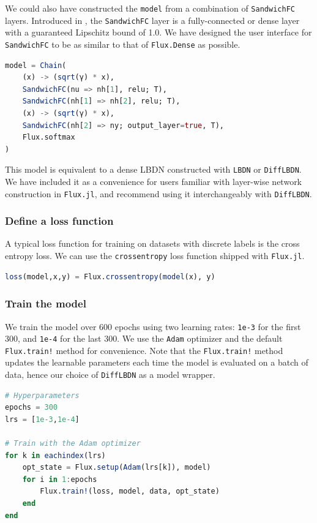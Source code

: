 We could also have constructed the \verb|model| from a combination of \verb|SandwichFC| layers. Introduced in \cite{Wang+Manchester2023}, the \verb|SandwichFC| layer is a fully-connected or dense layer with a guaranteed Lipschitz bound of 1.0. We have designed the user interface for \verb|SandwichFC| to be as similar to that of \verb|Flux.Dense| as possible.
\begin{lstlisting}[language = Julia]
model = Chain(
    (x) -> (sqrt(γ) * x),
    SandwichFC(nu => nh[1], relu; T),
    SandwichFC(nh[1] => nh[2], relu; T),
    (x) -> (sqrt(γ) * x),
    SandwichFC(nh[2] => ny; output_layer=true, T),
    Flux.softmax
)
\end{lstlisting}
This model is equivalent to a dense LBDN constructed with \verb|LBDN| or \verb|DiffLBDN|. We have included it as a convenience for users familiar with layer-wise network construction in \verb|Flux.jl|, and recommend using it interchangeably with \verb|DiffLBDN|.

\subsubsection{Define a loss function} \label{sec:mnist-loss}

A typical loss function for training on datasets with discrete labels is the cross entropy loss. We can use the \verb|crossentropy| loss function shipped with \verb|Flux.jl|.

\begin{lstlisting}[language = Julia]
loss(model,x,y) = Flux.crossentropy(model(x), y)
\end{lstlisting}

\subsubsection{Train the model} \label{sec:mnist-train}

We train the model over 600 epochs using two learning rates: \verb|1e-3| for the first 300, and \verb|1e-4| for the last 300. We use the \verb|Adam| optimizer \cite{Kingma+Ba2015} and the default \verb|Flux.train!| method for convenience. Note that the \verb|Flux.train!| method updates the learnable parameters each time the model is evaluated on a batch of data, hence our choice of \verb|DiffLBDN| as a model wrapper.

\begin{lstlisting}[language = Julia]
# Hyperparameters
epochs = 300
lrs = [1e-3,1e-4]

# Train with the Adam optimizer
for k in eachindex(lrs)
    opt_state = Flux.setup(Adam(lrs[k]), model)
    for i in 1:epochs
        Flux.train!(loss, model, data, opt_state)
    end
end
\end{lstlisting}

